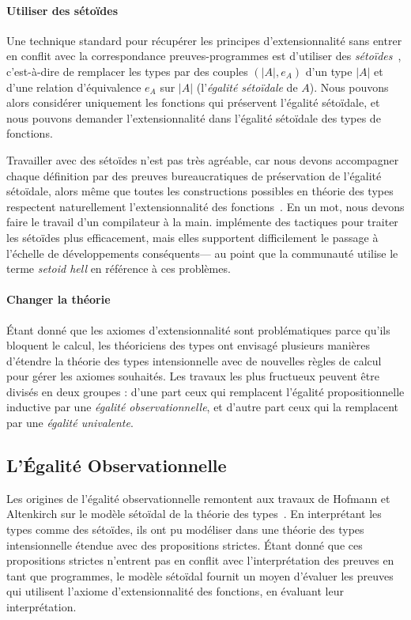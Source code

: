 \paragraph*{Utiliser des sétoïdes}
% 
Une technique standard pour récupérer les principes d'extensionnalité sans entrer
en conflit avec la correspondance preuves-programmes est d'utiliser des 
\emph{sétoïdes}~, c'est-à-dire de remplacer les types par 
des couples \( (|A|, e_A) \) d'un type \( |A| \) et d'une relation d'équivalence 
\( e_A \) sur \( |A| \) (l'\emph{égalité sétoïdale} de \( A \)).
% 
Nous pouvons alors considérer uniquement les fonctions qui préservent l'égalité 
sétoïdale, et nous pouvons demander l'extensionnalité dans l'égalité sétoïdale 
des types de fonctions.

Travailler avec des sétoïdes n'est pas très agréable, car nous devons accompagner 
chaque définition par des preuves bureaucratiques de préservation de l'égalité
sétoïdale, alors même que toutes les constructions possibles en théorie des types 
respectent naturellement l'extensionnalité des fonctions~. 
% 
En un mot, nous devons faire le travail d'un compilateur à la main. 
% 
\Coq implémente des tactiques pour traiter les sétoïdes plus efficacement, mais 
elles supportent difficilement le passage à l'échelle de développements conséquents---
au point que la communauté utilise le terme \emph{setoid hell} en référence à ces 
problèmes.

\paragraph*{Changer la théorie}
% 
Étant donné que les axiomes d'extensionnalité sont problématiques parce qu'ils 
bloquent le calcul, les théoriciens des types ont envisagé plusieurs manières 
d'étendre la théorie des types intensionnelle avec de nouvelles règles de calcul 
pour gérer les axiomes souhaités. 
% 
Les travaux les plus fructueux peuvent être divisés en deux groupes : d'une part ceux qui 
remplacent l'égalité propositionnelle inductive par une 
\emph{égalité observationnelle}, et d'autre part ceux qui la remplacent par une 
\emph{égalité univalente}.

\subsection{L'Égalité Observationnelle}

Les origines de l'égalité observationnelle remontent aux travaux de Hofmann et 
Altenkirch sur le modèle sétoïdal de la théorie des types~\cite{hofmann95,altenkirch99}.
% 
En interprétant les types comme des sétoïdes, ils ont pu modéliser
dans une théorie des types intensionnelle étendue avec des propositions strictes. 
Étant donné que ces propositions strictes n'entrent pas en conflit avec l'interprétation 
des preuves en tant que programmes, le modèle sétoïdal fournit un moyen d'évaluer les 
preuves qui utilisent l'axiome d'extensionnalité des fonctions, en évaluant leur 
interprétation.

